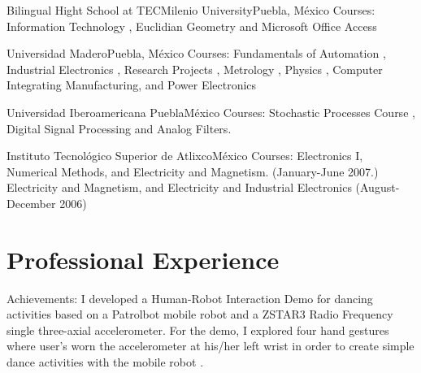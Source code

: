\documentclass[10pt,a4paper,roman]{moderncv}
\begin{document}
{Bilingual Hight School at TECMilenio University}{Puebla, M\'exico}{}
{Courses:
Information Technology \href{https://sites.google.com/site/perezxochicale/teaching/iit}{\faExternalLink},
Euclidian Geometry  \href{https://sites.google.com/site/perezxochicale/teaching/euclidean-geometry}{\faExternalLink}
and
Microsoft Office Access \href{https://sites.google.com/site/perezxochicale/teaching/moa}{\faExternalLink}
}

{Universidad Madero}{Puebla, M\'exico}{}
{Courses: Fundamentals of Automation
\href{https://sites.google.com/site/perezxochicale/digital-electronics}{\faExternalLink},
Industrial Electronics \href{https://sites.google.com/site/perezxochicale/ie}{\faExternalLink},
Research Projects \href{https://sites.google.com/site/perezxochicale/latex/thesistemplate}{\faExternalLink},
Metrology \href{https://sites.google.com/site/perezxochicale/metrology}{\faExternalLink},
Physics \href{http://goo.gl/fffnG}{\faExternalLink},
Computer Integrating Manufacturing, and Power Electronics
}

{Universidad Iberoamericana Puebla}{M\'exico}{}
{Courses: Stochastic Processes Course
\href{https://sites.google.com/site/perezxochicale/stochastic-processes-course}{\faExternalLink},
Digital Signal Processing
\href{https://sites.google.com/site/perezxochicale/digital-signal-processing-course}{\faExternalLink}
and Analog Filters.
}

{Instituto Tecnol\'ogico Superior de Atlixco}{M\'exico}{}
{Courses: Electronics I, Numerical Methods, and Electricity and Magnetism. (January-June 2007.)
Electricity and Magnetism, and Electricity and Industrial Electronics (August-December 2006)
}


\section{Professional Experience}

{Achievements: I developed a Human-Robot Interaction Demo for dancing activities based on 
a Patrolbot mobile robot and a ZSTAR3 Radio Frequency single three-axial accelerometer.
For the demo, I explored four hand gestures where user's worn the accelerometer at his/her 
left wrist in order to create simple dance activities with the mobile robot
\href{https://sites.google.com/site/perezxochicale/projects/demodance}{\faExternalLink}.
}
\end{document}
